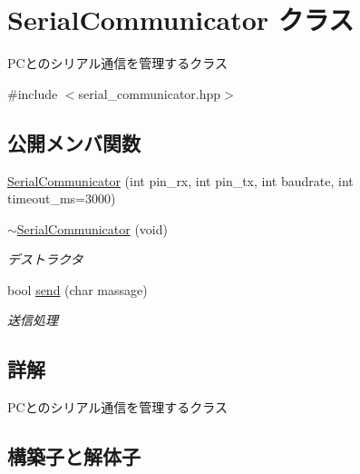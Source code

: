 \hypertarget{class_serial_communicator}{}\section{Serial\+Communicator クラス}
\label{class_serial_communicator}


P\+Cとのシリアル通信を管理するクラス  




{\ttfamily \#include $<$serial\+\_\+communicator.\+hpp$>$}

\subsection*{公開メンバ関数}
\begin{DoxyCompactItemize}
\item 
\mbox{\hyperlink{class_serial_communicator_aedf0af950a1920d4efafe41fac072b1a}{Serial\+Communicator}} (int pin\+\_\+rx, int pin\+\_\+tx, int baudrate, int timeout\+\_\+ms=3000)
\item 
\mbox{\hyperlink{class_serial_communicator_a591630c3e832911a8054658e21d3be5a}{$\sim$\+Serial\+Communicator}} (void)
\begin{DoxyCompactList}\small\item\em デストラクタ \end{DoxyCompactList}\item 
bool \mbox{\hyperlink{class_serial_communicator_add5f2442d225ecc542f4b8c58a970281}{send}} (char massage)
\begin{DoxyCompactList}\small\item\em 送信処理 \end{DoxyCompactList}\end{DoxyCompactItemize}


\subsection{詳解}
P\+Cとのシリアル通信を管理するクラス 

\subsection{構築子と解体子}
\mbox{\label{class_serial_communicator_aedf0af950a1920d4efafe41fac072b1a}} 
